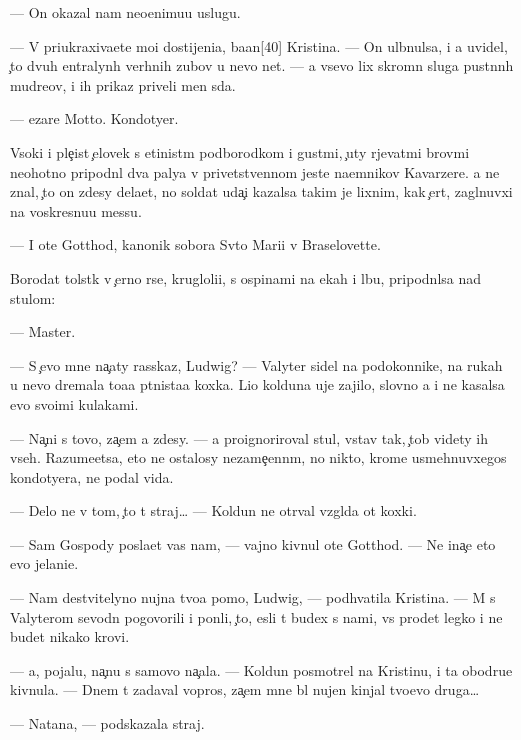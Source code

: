 \documentclass[10pt]{book}
\begin{document}
— On okazal nam neo{\q}enimu{\y}u uslugu.

— V{\yi} priukraxiva{\y}ete mo{\y}i dostijeni{\y}a, ba{\y}an[40] Kristina. — On ul{\yi}bnulsa, i {\y}a uvidel, {\c}to dvuh {\q}entralyn{\yi}h verhnih zubov u nevo net. — {\Y}a vsevo lix skromn{\yi}{\y} sluga pust{\yi}nn{\yi}h mudre{\q}ov, i ih prikaz{\yi} priveli men{\ia} s{\iu}da.

— {\C}ezare Motto. Kondotyer.

V{\yi}soki{\y} i ple{\c}ist{\yi}{\y} {\c}elovek s {\x}etinist{\yi}m podborodkom i gust{\yi}mi, {\c}uty r{\yi}jevat{\yi}mi brov{\ia}mi neohotno pripodn{\ia}l dva paly{\q}a v privetstvennom jeste na{\y}emnikov Kavarzere. {\Y}a ne znal, {\c}to on zdesy dela{\y}et, no soldat uda{\c}i kazalsa takim je lixnim, kak {\c}ert, zagl{\ia}nuvxi{\y} na voskresnu{\y}u messu.

— I ote{\q} Gotthod, kanonik sobora Sv{\ia}to{\y} Mari{\y}i v Braselovette.

Borodat{\yi}{\y} tolst{\ia}k v {\c}erno{\y} r{\ia}se, krugloli{\q}i{\y}, s ospinami na {\x}ekah i lbu, pripodn{\ia}lsa nad stulom:

— Master.

— S {\c}evo mne na{\c}aty rasskaz, Ludwig? — Valyter sidel na podokonnike, na rukah u nevo dremala to{\x}a{\y}a p{\ia}tnista{\y}a koxka. Li{\q}o kolduna uje zajilo, slovno {\y}a i ne kasalsa {\y}evo svo{\y}imi kulakami.

— Na{\c}ni s tovo, za{\c}em {\y}a zdesy. — {\Y}a pro{\y}ignoriroval stul, vstav tak, {\c}tob{\yi} videty ih vseh. Razume{\y}etsa, eto ne ostalosy nezame{\c}enn{\yi}m, no nikto, krome usmehnuvxegos{\ia} kondotyera, ne podal vida.

— Delo ne v tom, {\c}to t{\yi} straj… — Koldun ne otr{\yi}val vzgl{\ia}da ot koxki.

— Sam Gospody pos{\yi}la{\y}et vas nam, — vajno kivnul ote{\q} Gotthod. — Ne ina{\c}e eto {\y}evo jelani{\y}e.

— Nam de{\y}stvitelyno nujna tvo{\y}a pomo{\x}, Ludwig, — podhvatila Kristina. — M{\yi} s Valyterom sevodn{\ia} pogovorili i pon{\ia}li, {\c}to, {\y}esli t{\yi} budex s nami, vs{\e} pro{\y}det legko i ne budet nikako{\y} krovi.

— {\Y}a, pojalu{\y}, na{\c}nu s samovo na{\c}ala. — Koldun posmotrel na Kristinu, i ta obodr{\ia}{\y}u{\x}e kivnula. — Dnem t{\yi} zadaval vopros, za{\c}em mne b{\yi}l nujen kinjal tvo{\y}evo druga…

— Natana, — podskazala straj.
\end{document}
